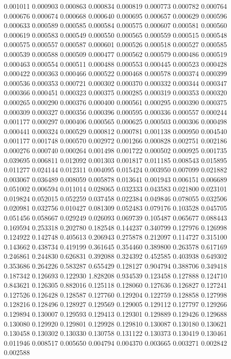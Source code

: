 0.001011
0.000903
0.000863
0.000834
0.000819
0.000773
0.000782
0.000764
0.000676
0.000674
0.000668
0.000640
0.000695
0.000657
0.000629
0.000596
0.000633
0.000589
0.000585
0.000584
0.000575
0.000607
0.000581
0.000560
0.000619
0.000583
0.000549
0.000550
0.000565
0.000559
0.000515
0.000548
0.000575
0.000557
0.000587
0.000601
0.000526
0.000518
0.000527
0.000585
0.000539
0.000588
0.000509
0.000477
0.000562
0.000579
0.000486
0.000519
0.000463
0.000554
0.000511
0.000488
0.000553
0.000445
0.000523
0.000428
0.000422
0.000363
0.000466
0.000522
0.000468
0.000578
0.000374
0.000399
0.000536
0.000353
0.000721
0.000302
0.000370
0.000332
0.000344
0.000347
0.000366
0.000451
0.000323
0.000375
0.000285
0.000319
0.000353
0.000320
0.000265
0.000290
0.000376
0.000400
0.000561
0.000295
0.000390
0.000375
0.000309
0.000327
0.000356
0.000396
0.000595
0.000336
0.000557
0.000244
0.001177
0.000297
0.000406
0.000565
0.000625
0.000503
0.000306
0.000498
0.000441
0.000324
0.000529
0.000812
0.000781
0.001138
0.000950
0.004540
0.001177
0.001748
0.000570
0.002972
0.001266
0.000828
0.002751
0.002186
0.000276
0.000740
0.000264
0.001498
0.001722
0.000502
0.000925
0.001735
0.039695
0.006811
0.012092
0.001303
0.001817
0.011185
0.008543
0.015895
0.011277
0.024144
0.012311
0.004095
0.015424
0.003950
0.007099
0.021882
0.003067
0.036489
0.008059
0.005878
0.013641
0.001943
0.006151
0.006689
0.051002
0.006594
0.011014
0.028065
0.032333
0.043583
0.021800
0.023101
0.019824
0.052015
0.052259
0.037458
0.022384
0.049846
0.078055
0.032506
0.020981
0.032756
0.010427
0.081309
0.052483
0.079176
0.103528
0.045705
0.051456
0.058667
0.029249
0.026093
0.069739
0.105487
0.065677
0.088443
0.169594
0.253318
0.202780
0.182548
0.144237
0.340799
0.127976
0.126998
0.124922
0.142748
0.405613
0.206943
0.275878
0.212097
0.114727
0.315100
0.143662
0.438734
0.419199
0.361645
0.354460
0.389800
0.263578
0.617169
0.246861
0.244830
0.626831
0.392088
0.324392
0.452585
0.403938
0.649302
0.353686
0.264226
0.583287
0.655429
0.128127
0.904794
0.388706
0.349418
0.187342
0.126693
0.122930
1.828208
0.934539
0.123458
0.127888
0.124710
0.843621
0.126305
0.882016
0.125118
0.128060
0.127636
0.126827
0.127241
0.127526
0.126428
0.128587
0.127760
0.129204
0.122759
0.128858
0.127998
0.128216
0.128496
0.128927
0.129569
0.129005
0.129112
0.127797
0.129266
0.129894
0.130007
0.129593
0.129413
0.129301
0.129889
0.129426
0.129688
0.130080
0.129920
0.129801
0.129928
0.129810
0.130087
0.130180
0.130621
0.130458
0.130302
0.130330
0.130758
0.131122
0.130373
0.130419
0.130461
0.011946
0.008517
0.005650
0.004794
0.004370
0.003665
0.003271
0.002842
0.002588
